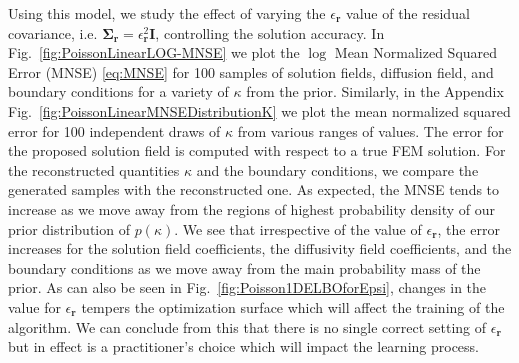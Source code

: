 \documentclass[11pt, fleqn]{article}
\def\r{{\mathbf r}}
\begin{document}
Using this model, we study the effect of varying the $\epsilon_\r$ value of the residual covariance, i.e. $\boldsymbol \Sigma_\r = \epsilon_\r^2 \boldsymbol I$, controlling the solution accuracy. In Fig.~\ref{fig:PoissonLinearLOG-MNSE} we plot the $\log$ Mean Normalized Squared Error (MNSE) \eqref{eq:MNSE} for 100 samples of solution fields, diffusion field, and boundary conditions for a variety of ${\kappa}$ from the prior. Similarly, in the Appendix Fig.~\ref{fig:PoissonLinearMNSEDistributionK} we plot the mean normalized squared error for 100 independent draws of $\kappa$ from various ranges of values. The error for the proposed solution field is computed with respect to a true \gls*{FEM} solution. For the reconstructed quantities $\kappa$ and the boundary conditions, we compare the generated samples with the reconstructed one. As expected, the MNSE tends to increase as we move away from the regions of highest probability density of our prior distribution of $p(\kappa)$. We see that irrespective of the value of $\epsilon_\r$, the error increases for the solution field coefficients, the diffusivity field coefficients, and the boundary conditions as we move away from the main probability mass of the prior. As can also be seen in Fig.~\ref{fig:Poisson1DELBOforEpsi}, changes in the value for $\epsilon_\r$ tempers the optimization surface which will affect the training of the algorithm. We can conclude from this that there is no single correct setting of $\epsilon_\r$ but in effect is a practitioner's choice which will impact the learning process.
\end{document}

